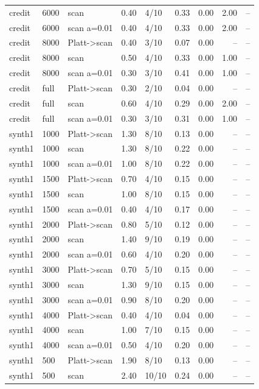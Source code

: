 \begin{tabular}{lllrlrrrr}
credit & 6000 & scan & 0.40 & 4/10 & 0.33 & 0.00 & 2.00 & -- \\
credit & 6000 & scan a=0.01 & 0.40 & 4/10 & 0.33 & 0.00 & 2.00 & -- \\
credit & 8000 & Platt->scan & 0.40 & 3/10 & 0.07 & 0.00 & -- & -- \\
credit & 8000 & scan & 0.50 & 4/10 & 0.33 & 0.00 & 1.00 & -- \\
credit & 8000 & scan a=0.01 & 0.30 & 3/10 & 0.41 & 0.00 & 1.00 & -- \\
credit & full & Platt->scan & 0.30 & 2/10 & 0.04 & 0.00 & -- & -- \\
credit & full & scan & 0.60 & 4/10 & 0.29 & 0.00 & 2.00 & -- \\
credit & full & scan a=0.01 & 0.30 & 3/10 & 0.31 & 0.00 & 1.00 & -- \\
synth1 & 1000 & Platt->scan & 1.30 & 8/10 & 0.13 & 0.00 & -- & -- \\
synth1 & 1000 & scan & 1.30 & 8/10 & 0.22 & 0.00 & -- & -- \\
synth1 & 1000 & scan a=0.01 & 1.00 & 8/10 & 0.22 & 0.00 & -- & -- \\
synth1 & 1500 & Platt->scan & 0.70 & 4/10 & 0.15 & 0.00 & -- & -- \\
synth1 & 1500 & scan & 1.00 & 8/10 & 0.15 & 0.00 & -- & -- \\
synth1 & 1500 & scan a=0.01 & 0.40 & 4/10 & 0.17 & 0.00 & -- & -- \\
synth1 & 2000 & Platt->scan & 0.80 & 5/10 & 0.12 & 0.00 & -- & -- \\
synth1 & 2000 & scan & 1.40 & 9/10 & 0.19 & 0.00 & -- & -- \\
synth1 & 2000 & scan a=0.01 & 0.60 & 4/10 & 0.20 & 0.00 & -- & -- \\
synth1 & 3000 & Platt->scan & 0.70 & 5/10 & 0.15 & 0.00 & -- & -- \\
synth1 & 3000 & scan & 1.30 & 9/10 & 0.15 & 0.00 & -- & -- \\
synth1 & 3000 & scan a=0.01 & 0.90 & 8/10 & 0.20 & 0.00 & -- & -- \\
synth1 & 4000 & Platt->scan & 0.40 & 4/10 & 0.04 & 0.00 & -- & -- \\
synth1 & 4000 & scan & 1.00 & 7/10 & 0.15 & 0.00 & -- & -- \\
synth1 & 4000 & scan a=0.01 & 0.50 & 4/10 & 0.20 & 0.00 & -- & -- \\
synth1 & 500 & Platt->scan & 1.90 & 8/10 & 0.13 & 0.00 & -- & -- \\
synth1 & 500 & scan & 2.40 & 10/10 & 0.24 & 0.00 & -- & -- \\

\end{tabular}
